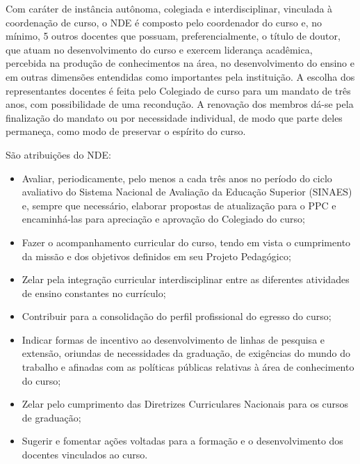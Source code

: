 Com caráter de instância autônoma, colegiada e interdisciplinar, vinculada à coordenação de curso, o NDE é composto pelo coordenador do curso e, no mínimo, 5 outros docentes que possuam, preferencialmente, o título de doutor, que atuam no desenvolvimento do curso e exercem liderança acadêmica, percebida na produção de conhecimentos na área, no desenvolvimento do ensino e em outras dimensões entendidas como importantes pela instituição. A escolha dos representantes docentes é feita pelo Colegiado de curso para um mandato de três anos, com possibilidade de uma recondução. A renovação dos membros dá-se pela finalização do mandato ou por necessidade individual, de modo que parte deles permaneça, como modo de preservar o espírito do curso. %

São atribuições do NDE:
\begin{itemize}
    \item Avaliar, periodicamente, pelo menos a cada três anos no período do ciclo avaliativo do Sistema Nacional de Avaliação da Educação Superior (SINAES) e, sempre que necessário, elaborar propostas de atualização para o PPC e encaminhá-las para apreciação e aprovação do Colegiado do curso;

    \item Fazer o acompanhamento curricular do curso, tendo em vista o cumprimento da missão e dos objetivos definidos em seu Projeto Pedagógico;
    
    \item Zelar pela integração curricular interdisciplinar entre as diferentes atividades de ensino constantes no currículo;
    
    \item Contribuir para a consolidação do perfil profissional do egresso do curso;

    \item Indicar formas de incentivo ao desenvolvimento de linhas de pesquisa e extensão, oriundas de necessidades da graduação, de exigências do mundo do trabalho e afinadas com as políticas públicas relativas à área de conhecimento do curso;
    
    \item Zelar pelo cumprimento das Diretrizes Curriculares Nacionais para os cursos de graduação;

    \item Sugerir e fomentar ações voltadas para a formação e o desenvolvimento dos docentes vinculados ao curso.
\end{itemize}

